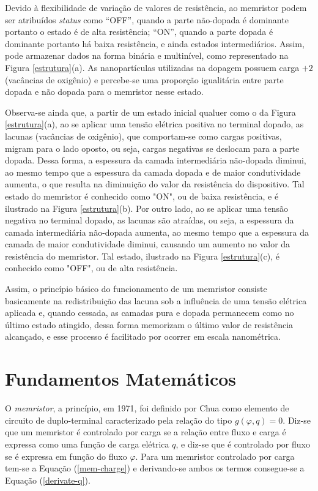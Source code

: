 \documentclass{ceel}
\begin{document}
\begin{multicols}{2}
Devido à flexibilidade de variação de valores de resistência, ao memristor podem ser atribuídos \emph{status} como “OFF”, quando a parte não-dopada é dominante portanto o estado é de alta resistência; “ON”, quando a parte dopada é dominante portanto há baixa resistência, e ainda estados intermediários. Assim, pode armazenar dados na forma binária e multinível, como representado na Figura \ref{estrutura}(a). As nanopartículas utilizadas na dopagem possuem carga $+2$ (vacâncias de oxigênio) e percebe-se uma proporção igualitária entre parte dopada e não dopada para o memristor nesse estado. 

Observa-se ainda que, a partir de um estado inicial qualuer como o da Figura \ref{estrutura}(a), ao se aplicar uma tensão elétrica positiva 
no terminal dopado, as lacunas (vacâncias de oxigênio), que comportam-se como cargas positivas, migram para o lado oposto, ou seja, cargas negativas se deslocam para a parte dopada.
 Dessa forma, a espessura da camada intermediária não-dopada diminui, ao mesmo tempo que a espessura da camada dopada e de maior condutividade aumenta, o que resulta na diminuição do valor da resistência do dispositivo. Tal estado do memristor é conhecido como "ON", ou de baixa resistência, e é ilustrado na Figura \ref{estrutura}(b). 
%
Por outro lado, ao se aplicar uma tensão negativa no terminal dopado, as lacunas são atraídas, ou seja, a espessura da camada intermediária não-dopada aumenta, ao mesmo tempo que a espessura 
da camada de maior condutividade diminui, causando um aumento no valor da resistência do memristor. Tal estado, ilustrado na Figura \ref{estrutura}(c), é conhecido como "OFF", ou de alta resistência. 

Assim, o princípio básico do funcionamento de um memristor consiste basicamente na redistribuição das lacuna sob a influência de uma tensão elétrica aplicada e, quando cessada, as 
camadas pura e dopada permanecem como no último estado atingido, dessa forma memorizam o último valor de resistência alcançado, e esse processo é facilitado por ocorrer em 
escala nanométrica. %

\section{Fundamentos Matemáticos}\label{analise-matematica}
O \emph{memristor}, a princípio, em 1971, foi definido por Chua \cite{artigo} como elemento de circuito de duplo-terminal caracterizado pela relação do tipo $g(\varphi, q)=0$. Diz-se que 
um memristor é controlado por carga se a relação entre fluxo e carga é expressa como uma função de carga elétrica $q$, e diz-se que é controlado por fluxo se é expressa em função do 
fluxo $\varphi$. Para um memristor controlado por carga tem-se a Equação (\ref{mem-charge}) e derivando-se ambos os termos consegue-se a Equação (\ref{derivate-q}).


\end{multicols}
\end{document}
